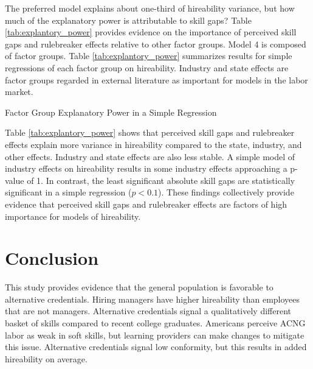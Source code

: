 \documentclass[review]{elsarticle}
\begin{document}
The preferred model explains about one-third of hireability variance,
but how much of the explanatory power is attributable to skill gaps?
Table \ref{tab:explantory_power} provides evidence on the importance of perceived skill gaps and rulebreaker effects
relative to other factor groups.
Model 4 is composed of factor groups.
Table \ref{tab:explantory_power} summarizes results for simple regressions of each factor group on hireability.
Industry and state effects are factor groups regarded in external literature as important for models in the labor market.

\begin{table}
    \caption{Factor Group Explanatory Power in a Simple Regression}
    \resizebox{\columnwidth}{!}{
        
    }
    \label{tab:explantory_power}
\end{table}

Table \ref{tab:explantory_power} shows that perceived skill gaps and rulebreaker effects explain more
variance in hireability compared to the state, industry, and other effects.
Industry and state effects are also less stable.
A simple model of industry effects on hireability results in some industry effects approaching a p-value of 1.
In contrast, the least significant absolute skill gaps are statistically significant in a simple regression ($p < 0.1$).
These findings collectively provide evidence that perceived skill gaps and rulebreaker
effects are factors of high importance for models of hireability.

\section{Conclusion}

This study provides evidence that the general population is favorable to alternative credentials.
Hiring managers have higher hireability than employees that are not managers.
Alternative credentials signal a qualitatively different basket of skills compared to recent college graduates.
Americans perceive ACNG labor as weak in soft skills,
but learning providers can make changes to mitigate this issue.
Alternative credentials signal low conformity, but this results in added hireability on average.
\end{document}
